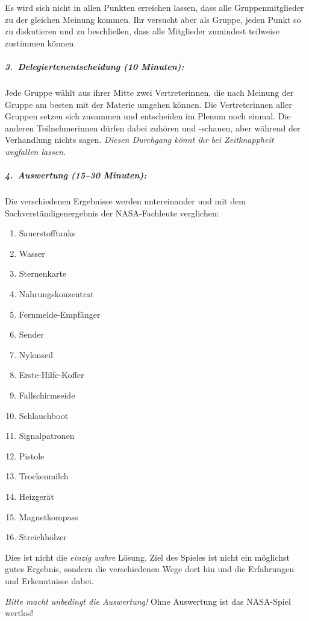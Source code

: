 Es wird sich nicht in allen Punkten erreichen lassen, dass alle Gruppenmitglieder zu der gleichen Meinung kommen. Ihr versucht aber als Gruppe, jeden Punkt so zu diskutieren und zu beschließen, dass alle Mitglieder zumindest teilweise zustimmen können.
\subparagraph{3.~Delegiertenentscheidung (10 Minuten):} Jede Gruppe wählt aus ihrer Mitte zwei Vertreterinnen, die nach Meinung der Gruppe am besten mit der Materie umgehen können. Die Vertreterinnen aller Gruppen setzen sich zusammen und entscheiden im Plenum noch einmal. Die anderen Teilnehmerinnen dürfen dabei zuhören  und -schauen, aber während der Verhandlung nichts sagen. \emph{Diesen Durchgang könnt ihr bei Zeitknappheit wegfallen lassen.}
\subparagraph{4.~Auswertung (15--30 Minuten):} Die verschiedenen Ergebnisse werden untereinander und mit dem Sachverständigenergebnis der NASA-Fachleute verglichen:
  \begin{enumerate}
  \item Sauerstofftanks
  \item Wasser
  \item Sternenkarte
  \item Nahrungskonzentrat
  \item Fernmelde-Empfänger
  \item Sender
  \item Nylonseil
  \item Erste-Hilfe-Koffer
  \item Fallschirmseide
  \item Schlauchboot
  \item Signalpatronen
  \item Pistole
  \item Trockenmilch
  \item Heizgerät
  \item Magnetkompass
  \item Streichhölzer
  \end{enumerate}
Dies ist nicht die \emph{einzig wahre} Lösung. Ziel des Spieles ist nicht ein möglichst gutes Ergebnis, sondern die verschiedenen Wege dort hin und die Erfahrungen und Erkenntnisse dabei.

\emph{Bitte macht unbedingt die Auswertung!} Ohne Auswertung ist das NASA-Spiel wertlos!

